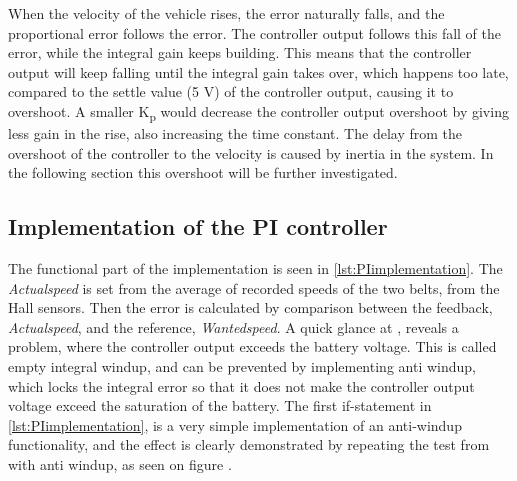 When the velocity of the vehicle rises, the error naturally falls, and the proportional error follows the error. The controller output follows this fall of the error, while the integral gain keeps building. This means that the controller output will keep falling until the integral gain takes over, which happens too late, compared to the settle value (5 V) of the controller output, causing it to overshoot. A smaller \si{K_p} would decrease the controller output overshoot by giving less gain in the rise, also increasing the time constant.
The delay from the overshoot of the controller to the velocity is caused by inertia in the system.
In the following section this overshoot will be further investigated.
%
\subsection{Implementation of the PI controller}
The functional part of the implementation is seen in \autoref{lst:PIimplementation}. The \emph{Actualspeed} is set from the average of recorded speeds of the two belts, from the Hall sensors. Then the error is calculated by comparison between the feedback, \emph{Actualspeed}, and the reference, \emph{Wantedspeed}.
A quick glance at , reveals a problem, where the controller output exceeds the battery voltage. This is called empty integral windup, and can be prevented by implementing anti windup, which locks the integral error so that it does not make the controller output voltage exceed the saturation of the battery. The first if-statement in \autoref{lst:PIimplementation}, is a very simple implementation of an anti-windup functionality, and the effect is clearly demonstrated by repeating the test from  with anti windup, as seen on figure .

